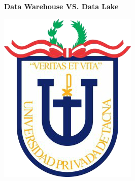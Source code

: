 \documentclass[11pt,a4paper]{article}
\begin{document}
	
	\begin{center}
		\huge \textbf{Data Warehouse VS. Data Lake} 
	\end{center}
	\vspace{\baselineskip}
	\begin{center}
		\includegraphics[scale=0.37]{./Imagenes/logo}
	\end{center}
	\vspace{\baselineskip}
\end{document}
